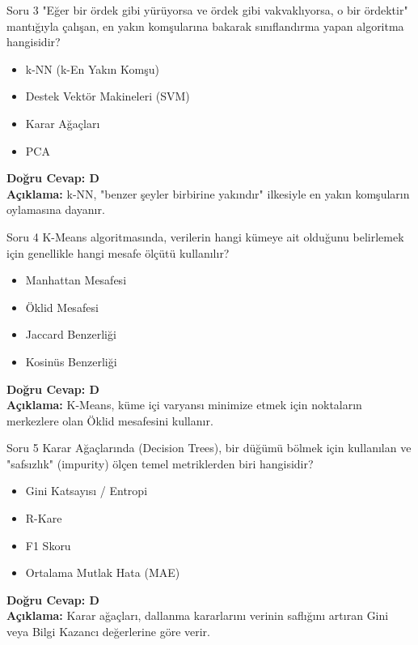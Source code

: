 \documentclass[12pt,a4paper]{article}
\begin{document}
\begin{testcard}{Soru 3}
    "Eğer bir ördek gibi yürüyorsa ve ördek gibi vakvaklıyorsa, o bir ördektir" mantığıyla çalışan, en yakın komşularına bakarak sınıflandırma yapan algoritma hangisidir?
    \begin{itemize}
        \item[A)] k-NN (k-En Yakın Komşu)
        \item[B)] Destek Vektör Makineleri (SVM)
        \item[C)] Karar Ağaçları
        \item[D)] PCA
    \end{itemize}
    \tcblower
    \textbf{Doğru Cevap: D} \\
    \textbf{Açıklama:} k-NN, "benzer şeyler birbirine yakındır" ilkesiyle en yakın komşuların oylamasına dayanır.
\end{testcard}

\begin{testcard}{Soru 4}
    K-Means algoritmasında, verilerin hangi kümeye ait olduğunu belirlemek için genellikle hangi mesafe ölçütü kullanılır?
    \begin{itemize}
        \item[A)] Manhattan Mesafesi
        \item[B)] Öklid Mesafesi
        \item[C)] Jaccard Benzerliği
        \item[D)] Kosinüs Benzerliği
    \end{itemize}
    \tcblower
    \textbf{Doğru Cevap: D} \\
    \textbf{Açıklama:} K-Means, küme içi varyansı minimize etmek için noktaların merkezlere olan Öklid mesafesini kullanır.
\end{testcard}

\begin{testcard}{Soru 5}
    Karar Ağaçlarında (Decision Trees), bir düğümü bölmek için kullanılan ve "safsızlık" (impurity) ölçen temel metriklerden biri hangisidir?
    \begin{itemize}
        \item[A)] Gini Katsayısı / Entropi
        \item[B)] R-Kare
        \item[C)] F1 Skoru
        \item[D)] Ortalama Mutlak Hata (MAE)
    \end{itemize}
    \tcblower
    \textbf{Doğru Cevap: D} \\
    \textbf{Açıklama:} Karar ağaçları, dallanma kararlarını verinin saflığını artıran Gini veya Bilgi Kazancı değerlerine göre verir.
\end{testcard}
\end{document}
